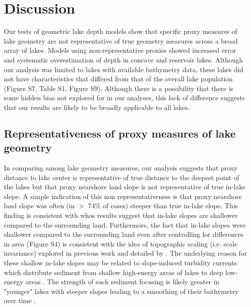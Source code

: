 \documentclass[draft]{agujournal2019}
\begin{document}
\section{Discussion}
\noindent
Our tests of geometric lake depth models show that specific proxy measures of lake geometry are not representative of true geometry measures across a broad array of lakes. Models using non-representative proxies showed increased error and systematic overestimation of depth in concave and reservoir lakes. Although our analysis was limited to lakes with available bathymetry data, these lakes did not have characteristics that differed from that of the overall lake population (Figure S7, Table S1, Figure S9). Although there is a possibility that there is some hidden bias not explored for in our analyses, this lack of difference suggests that our results are likely to be broadly applicable to all lakes.

\subsection{Representativeness of proxy measures of lake geometry}
\noindent
In comparing among lake geometry measures, our analysis suggests that proxy distance to lake center is representative of true distance to the deepest point of the lakes but that proxy nearshore land slope is not representative of true in-lake slope. A simple indication of this non representativeness is that proxy nearshore land slope was often (in $>$ 74\% of cases) steeper than true in-lake slope. This finding is consistent with  whos results suggest that in-lake slopes are shallower compared to the surrounding land. Furthermore, the fact that in-lake slopes were shallower compared to the surrounding land even after controlling for differences in area (Figure S4) is consistent with the idea of topographic scaling (i.e. scale invariance) explored in previous work and detailed by \cite{caelVolumeMeanDepth2017}. The underlying reason for these shallow in-lake slopes may be related to slope-induced turbidity currents which distribute sediment from shallow high-energy areas of lakes to deep low-energy areas \cite{hakansonLakeBottomDynamics1981, johanssonNewApproachesModelling2007}. The strength of such sediment focusing is likely greater in "younger" lakes with steeper slopes leading to a smoothing of their bathymetry over time \cite{blaisInfluenceLakeMorphometry1995}.
\end{document}
